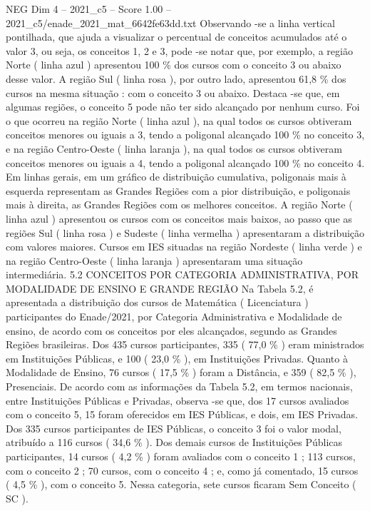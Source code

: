 \begin{textsample}{NEG Dim 4 – 2021\_c5 – Score 1.00 – 2021\_c5/enade\_2021\_mat\_6642fe63dd.txt}
Observando -se a linha vertical pontilhada, que ajuda a visualizar o percentual de conceitos acumulados até o valor 3, ou seja, os conceitos 1, 2 e 3, pode -se notar que, por exemplo, a região Norte ( linha azul ) apresentou 100 \% dos cursos com o conceito 3 ou abaixo desse valor.
A região Sul ( linha rosa ), por outro lado, apresentou 61,8 \% dos cursos na mesma situação : com o conceito 3 ou abaixo.
Destaca -se que, em algumas regiões, o conceito 5 pode não ter sido alcançado por nenhum curso.
Foi o que ocorreu na região Norte ( linha azul ), na qual todos os cursos obtiveram conceitos menores ou iguais a 3, tendo a poligonal alcançado 100 \% no conceito 3, e na região Centro-Oeste ( linha laranja ), na qual todos os cursos obtiveram conceitos menores ou iguais a 4, tendo a poligonal alcançado 100 \% no conceito 4.
Em linhas gerais, em um gráfico de distribuição cumulativa, poligonais mais à esquerda representam as Grandes Regiões com a pior distribuição, e poligonais mais à direita, as Grandes Regiões com os melhores conceitos.
A região Norte ( linha azul ) apresentou os cursos com os conceitos mais baixos, ao passo que as regiões Sul ( linha rosa ) e Sudeste ( linha vermelha ) apresentaram a distribuição com valores maiores.
Cursos em IES situadas na região Nordeste ( linha verde ) e na região Centro-Oeste ( linha laranja ) apresentaram uma situação intermediária. 5.2 CONCEITOS POR CATEGORIA ADMINISTRATIVA, POR MODALIDADE DE ENSINO E GRANDE REGIÃO Na Tabela 5.2, é apresentada a distribuição dos cursos de Matemática ( Licenciatura ) participantes do Enade/2021, por Categoria Administrativa e Modalidade de ensino, de acordo com os conceitos por eles alcançados, segundo as Grandes Regiões brasileiras.
Dos 435 cursos participantes, 335 ( 77,0 \% ) eram ministrados em Instituições Públicas, e 100 ( 23,0 \% ), em Instituições Privadas.
Quanto à Modalidade de Ensino, 76 cursos ( 17,5 \% ) foram a Distância, e 359 ( 82,5 \% ), Presenciais.
De acordo com as informações da Tabela 5.2, em termos nacionais, entre Instituições Públicas e Privadas, observa -se que, dos 17 cursos avaliados com o conceito 5, 15 foram oferecidos em IES Públicas, e dois, em IES Privadas.
Dos 335 cursos participantes de IES Públicas, o conceito 3 foi o valor modal, atribuído a 116 cursos ( 34,6 \% ).
Dos demais cursos de Instituições Públicas participantes, 14 cursos ( 4,2 \% ) foram avaliados com o conceito 1 ; 113 cursos, com o conceito 2 ; 70 cursos, com o conceito 4 ; e, como já comentado, 15 cursos ( 4,5 \% ), com o conceito 5.
Nessa categoria, sete cursos ficaram Sem Conceito ( SC ).

\end{textsample}
